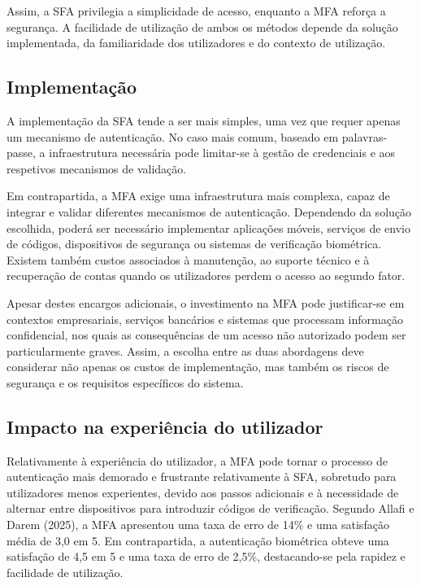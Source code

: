 \hspace{1cm} Assim, a SFA privilegia a simplicidade de acesso, enquanto a MFA reforça a segurança. A facilidade de utilização de ambos os métodos depende da solução implementada, da familiaridade dos utilizadores e do contexto de utilização.

\subsection{Implementação}

\hspace{1cm} A implementação da SFA tende a ser mais simples, uma vez que requer apenas um mecanismo de autenticação. No caso mais comum, baseado em palavras-passe, a infraestrutura necessária pode limitar-se à gestão de credenciais e aos respetivos mecanismos de validação.

\hspace{1cm} Em contrapartida, a MFA exige uma infraestrutura mais complexa, capaz de integrar e validar diferentes mecanismos de autenticação. Dependendo da solução escolhida, poderá ser necessário implementar aplicações móveis, serviços de envio de códigos, dispositivos de segurança ou sistemas de verificação biométrica. Existem também custos associados à manutenção, ao suporte técnico e à recuperação de contas quando os utilizadores perdem o acesso ao segundo fator.

\hspace{1cm} Apesar destes encargos adicionais, o investimento na MFA pode justificar-se em contextos empresariais, serviços bancários e sistemas que processam informação confidencial, nos quais as consequências de um acesso não autorizado podem ser particularmente graves. Assim, a escolha entre as duas abordagens deve considerar não apenas os custos de implementação, mas também os riscos de segurança e os requisitos específicos do sistema.

\subsection{Impacto na experiência do utilizador}

\hspace{1cm} Relativamente à experiência do utilizador, a MFA pode tornar o processo de autenticação mais demorado e frustrante relativamente à SFA, sobretudo para utilizadores menos experientes, devido aos passos adicionais e à necessidade de alternar entre dispositivos para introduzir códigos de verificação. Segundo Allafi e Darem (2025), a MFA apresentou uma taxa de erro de 14\% e uma satisfação média de 3,0 em 5. Em contrapartida, a autenticação biométrica obteve uma satisfação de 4,5 em 5 e uma taxa de erro de 2,5\%, destacando-se pela rapidez e facilidade de utilização.

